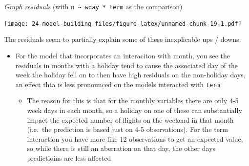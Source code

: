 \documentclass[]{book}
\newenvironment{Shaded}{\begin{snugshade}}{\end{snugshade}}
\newcommand{\DataTypeTok}[1]{\textcolor[rgb]{0.13,0.29,0.53}{#1}}
\newcommand{\DecValTok}[1]{\textcolor[rgb]{0.00,0.00,0.81}{#1}}
\newcommand{\KeywordTok}[1]{\textcolor[rgb]{0.13,0.29,0.53}{\textbf{#1}}}
\newcommand{\NormalTok}[1]{#1}
\newcommand{\OperatorTok}[1]{\textcolor[rgb]{0.81,0.36,0.00}{\textbf{#1}}}
\newcommand{\StringTok}[1]{\textcolor[rgb]{0.31,0.60,0.02}{#1}}
\providecommand{\tightlist}{%
  \setlength{\itemsep}{0pt}\setlength{\parskip}{0pt}}
\theoremstyle{definition}
\theoremstyle{definition}
\theoremstyle{definition}
\theoremstyle{remark}
\begin{document}
\begin{enumerate}
  \emph{Graph residuals} (with
  \texttt{n\ \textasciitilde{}\ wday\ *\ term} as the comparison)

\begin{Shaded}
\end{Shaded}

  \texttt{[image: 24-model-building\_files/figure-latex/unnamed-chunk-19-1.pdf]}

  The residuals seem to partially explain some of these inexplicable ups
  / downs:

  \begin{itemize}
  \tightlist
  \item
    For the model that incorporates an interaciton with month, you see
    the residuals in months with a holiday tend to cause the associated
    day of the week the holiday fell on to then have high residuals on
    the non-holiday days, an effect thta is less pronounced on the
    models interacted with \texttt{term}

    \begin{itemize}
    \tightlist
    \item
      The reason for this is that for the monthly variables there are
      only 4-5 week days in each month, so a holiday on one of these can
      substantially impact the expected number of flights on the weekend
      in that month (i.e.~the prediction is based just on 4-5
      observations). For the term interaction you have more like 12
      observations to get an expected value, so while there is still an
      aberration on that day, the other days predictioins are less
      affected
    \end{itemize}
  \end{itemize}


\end{enumerate}
\end{document}
